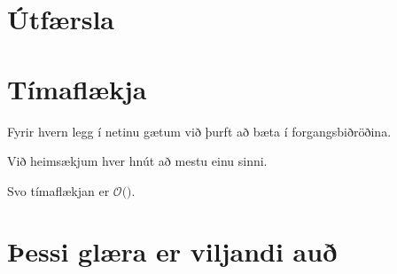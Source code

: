 \section{Útfærsla}
{
}

\section{Tímaflækja}
{
	{
		\item<1-> Fyrir hvern legg í netinu gætum við þurft að bæta í forgangsbiðröðina.
		\item<2-> Við heimsækjum hver hnút að mestu einu sinni.
		\item<3-> Svo tímaflækjan er $\mathcal{O}($\onslide<4->{$(V + E) \log E$}$)$.
	}
}

\section{Þessi glæra er viljandi auð}
{
}


